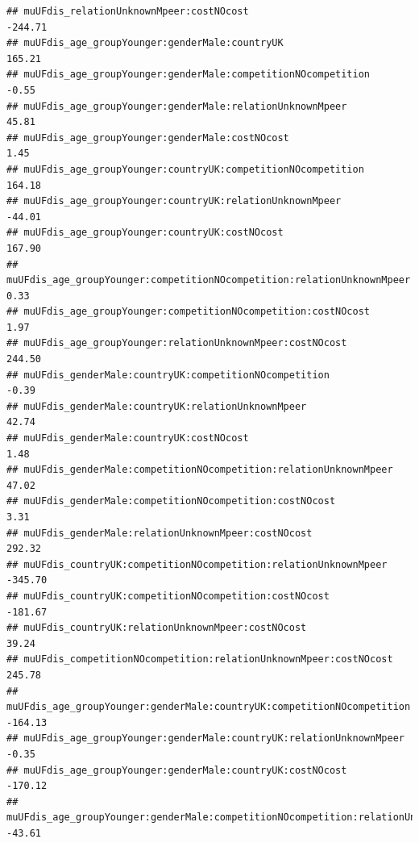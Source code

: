 \documentclass[
]{article}
\begin{document}
\begin{verbatim}
## muUFdis_relationUnknownMpeer:costNOcost                                                       -244.71
## muUFdis_age_groupYounger:genderMale:countryUK                                                  165.21
## muUFdis_age_groupYounger:genderMale:competitionNOcompetition                                    -0.55
## muUFdis_age_groupYounger:genderMale:relationUnknownMpeer                                        45.81
## muUFdis_age_groupYounger:genderMale:costNOcost                                                   1.45
## muUFdis_age_groupYounger:countryUK:competitionNOcompetition                                    164.18
## muUFdis_age_groupYounger:countryUK:relationUnknownMpeer                                        -44.01
## muUFdis_age_groupYounger:countryUK:costNOcost                                                  167.90
## muUFdis_age_groupYounger:competitionNOcompetition:relationUnknownMpeer                           0.33
## muUFdis_age_groupYounger:competitionNOcompetition:costNOcost                                     1.97
## muUFdis_age_groupYounger:relationUnknownMpeer:costNOcost                                       244.50
## muUFdis_genderMale:countryUK:competitionNOcompetition                                           -0.39
## muUFdis_genderMale:countryUK:relationUnknownMpeer                                               42.74
## muUFdis_genderMale:countryUK:costNOcost                                                          1.48
## muUFdis_genderMale:competitionNOcompetition:relationUnknownMpeer                                47.02
## muUFdis_genderMale:competitionNOcompetition:costNOcost                                           3.31
## muUFdis_genderMale:relationUnknownMpeer:costNOcost                                             292.32
## muUFdis_countryUK:competitionNOcompetition:relationUnknownMpeer                               -345.70
## muUFdis_countryUK:competitionNOcompetition:costNOcost                                         -181.67
## muUFdis_countryUK:relationUnknownMpeer:costNOcost                                               39.24
## muUFdis_competitionNOcompetition:relationUnknownMpeer:costNOcost                               245.78
## muUFdis_age_groupYounger:genderMale:countryUK:competitionNOcompetition                        -164.13
## muUFdis_age_groupYounger:genderMale:countryUK:relationUnknownMpeer                              -0.35
## muUFdis_age_groupYounger:genderMale:countryUK:costNOcost                                      -170.12
## muUFdis_age_groupYounger:genderMale:competitionNOcompetition:relationUnknownMpeer              -43.61

\end{verbatim}
\end{document}
